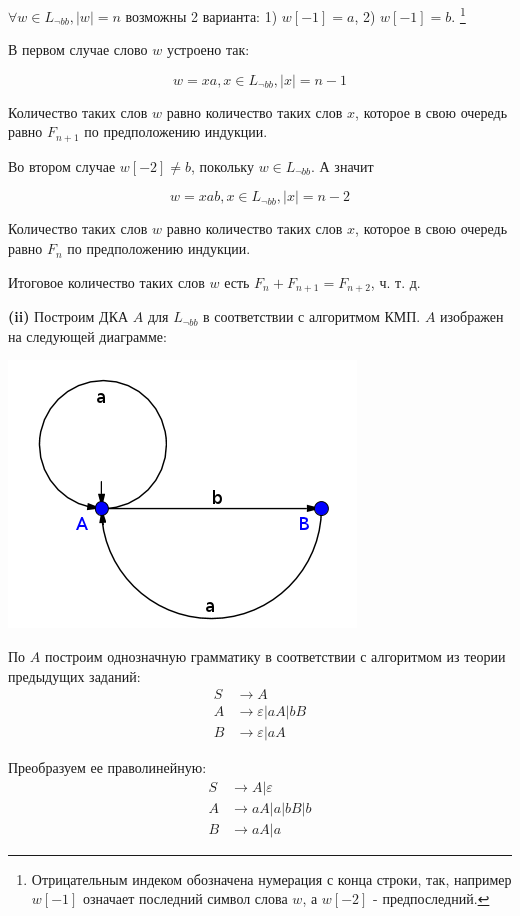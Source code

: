 \documentclass[10pt]{article}
\let \eps \varepsilon
\begin{document}
$\forall w \in L_{\neg bb}, |w| = n$ возможны 2 варианта: 1) $w[-1] = a$, 2) $w[-1] = b$.
\footnote{Отрицательным индеком обозначена нумерация с конца строки, так, например $w[-1]$ означает последний символ слова $w$, а $w[-2]$ - предпоследний.}

В первом случае слово $w$ устроено так:

$$
  w = xa, x \in L_{\neg bb}, |x| = n - 1
$$

Количество таких слов $w$ равно количество таких слов $x$, которое в свою очередь равно $F_{n + 1}$ по предположению индукции.

Во втором случае $w[-2] \neq b$, покольку $w \in L_{\neg bb}$. А значит

$$
  w = xab, x \in L_{\neg bb}, |x| = n - 2
$$

Количество таких слов $w$ равно количество таких слов $x$, которое в свою очередь равно $F_n$ по предположению индукции.

Итоговое количество таких слов $w$ есть $F_n + F_{n + 1} = F_{n + 2}$, ч. т. д.

\smallskip

{\bf (ii)} Построим ДКА $A$ для $L_{\neg bb}$ в соответствии с алгоритмом КМП. $A$ изображен на следующей диаграмме:

\centerline{\includegraphics{a.png}}

По $A$ построим однозначную грамматику в соответствии с алгоритмом из теории предыдущих заданий:
\begin{align*}
  S &\rightarrow A \\
  A &\rightarrow \eps | a A | b B \\
  B &\rightarrow \eps | a A
\end{align*}

Преобразуем ее праволинейную:
\begin{align*}
  S &\rightarrow A | \eps \\
  A &\rightarrow a A | a | b B | b \\
  B &\rightarrow a A | a
\end{align*}
\end{document}
